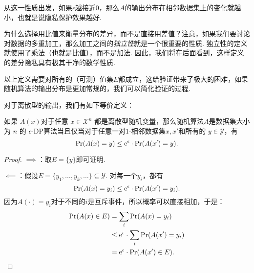 从这一性质出发，如果$\epsilon$越接近$0$，那么$A$的输出分布在相邻数据集上的变化就越小，也就是说隐私保护效果越好.

\begin{remark}
    为什么选择用比值来衡量分布的差异，而不是直接用差值？注意，如果我们要讨论对数据的多重加工，那么加工之间的\emph{独立性}就是一个很重要的性质. 独立性的定义就使用了乘法（也就是比值），而不是加法. 因此，我们将在后面看到，这样定义的差分隐私具有极其干净的数学性质. 
\end{remark}

以上定义需要对所有的（可测）值集$E$都成立，这给验证带来了极大的困难，如果随机算法的输出分布是更加常规的，我们可以简化验证的过程. 

对于离散型的输出，我们有如下等价定义：
\begin{proposition}\label{prop:discrete-dp}
    如果 $A(x)$对于任意 $x \in \mathcal X^n$ 都是离散型随机变量，那么随机算法$A$是数据集大小为 $n$ 的 $\epsilon$-DP算法当且仅当对于任意一对$1$-相邻数据集$x, x'$和所有的 $y \in \mathcal Y$，有
    \[
    \Pr(A(x) = y) \leq \mathrm{e}^{\epsilon} \cdot \Pr(A(x') = y).
    \]
\end{proposition}
\begin{proof}
$\implies$：取$E = \{y\}$即可证明.

$\impliedby$：假设$E=\{y_1,\dots,y_k,\dots\}\subseteq\mathcal Y$. 对每一个$y_i$，都有
    \[
    \Pr(A(x) = y_i) \leq \mathrm{e}^{\epsilon} \cdot \Pr(A(x') = y_i).
    \]
因为$A(\cdot)=y_i$对于不同的$i$是互斥事件，所以概率可以直接相加，于是：
    \begin{align*}
    \Pr(A(x) \in E) &= \sum_i \Pr(A(x) = y_i) \\
    &\leq \mathrm{e}^{\epsilon} \cdot \sum_i\Pr(A(x') = y_i) \\
    &= \mathrm{e}^{\epsilon} \cdot \Pr(A(x') \in E).
    \end{align*}
\end{proof}

